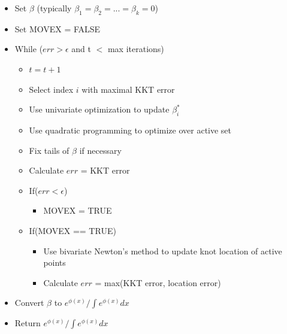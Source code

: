 \documentclass[12pt]{article}
\numberwithin{equation}{section}
\begin{document}
	\vspace{3mm}
	
	\begin{itemize}
	
		\item Set $\beta$ (typically $\beta_1 = \beta_2 =...=\beta_k = 0$)
		
		\item Set MOVEX = FALSE
		
		\item While ($err > \epsilon$ and t $<$ max iterations)
		
			\begin{itemize}
			
			\item $t = t + 1$
			
			\item Select index $i$ with maximal KKT error
			
			\item Use univariate optimization to update $\beta_i^*$
						
			\item Use quadratic programming to optimize over active set
			
			\item Fix tails of $\beta$ if necessary
			
			\item Calculate $err$ = KKT error
			
			\item If($err < \epsilon$)
				
				\begin{itemize}
				
				\item MOVEX = TRUE
				
				\end{itemize}
			
			\item If(MOVEX == TRUE)
				
				\begin{itemize}
										
				\item Use bivariate Newton's method to update knot location of active points
				
				\item Calculate $err$ = max(KKT error, location error)
				
				\end{itemize}
			
			\end{itemize}
	
	\item Convert $\beta$ to $e^{\phi(x)} / \int e ^ {\phi(x)} dx$
	
	\item Return $e^{\phi(x)} / \int e ^ {\phi(x)}dx$
	
	\end{itemize}
	
\end{document}
